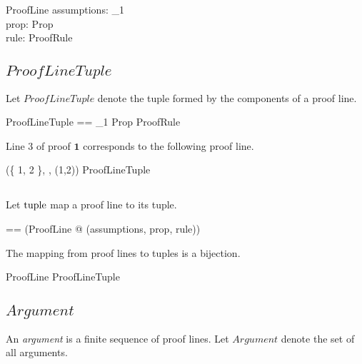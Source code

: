 \documentclass[11pt, oneside]{article}
\begin{document}
\begin{schema}{ProofLine}
	assumptions: \finset \nat_1 \\
	prop: Prop \\
	rule: ProofRule
\end{schema}

\subsection{$ProofLineTuple$}

Let $ProofLineTuple$ denote the tuple formed by the components of a proof line.

\begin{zed}
	ProofLineTuple == \finset \nat_1 \cross Prop \cross ProofRule
\end{zed}

\begin{example}
Line 3 of proof $\mathbf{1}$ corresponds to the following proof line.

\begin{zed}
	(\{ 1, 2 \}, \propQ, (1,2)) \in ProofLineTuple
\end{zed}

\end{example}

\subsection{}

Let $\operatorname{tuple}$ map a proof line to its tuple.

\begin{zed}
	\proofLineTuple == (\lambda ProofLine @ (assumptions, prop, rule))
\end{zed}

\begin{remark}
The mapping from proof lines to tuples is a bijection.

\begin{zed}
	\proofLineTuple \in ProofLine \bij ProofLineTuple
\end{zed}

\end{remark}

\subsection{$Argument$}

An {\it argument} is a finite sequence of proof lines.
Let $Argument$ denote the set of all arguments.
\end{document}
